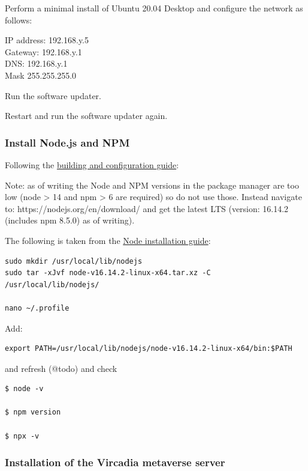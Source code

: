 Perform a minimal install of Ubuntu 20.04 Desktop and configure the
network as follows:

IP address: 192.168.y.5\\
Gateway: 192.168.y.1\\
DNS: 192.168.y.1\\
Mask 255.255.255.0

Run the software updater.

Restart and run the software updater again.

\hypertarget{install-node.js-and-npm}{%
\subsubsection{Install Node.js and NPM}\label{install-node.js-and-npm}}

Following the
\href{https://github.com/vircadia/vircadia-metaverse/blob/master/docs/Building.md}{building
and configuration guide}:

Note: as of writing the Node and NPM versions in the package manager are
too low (node \textgreater{} 14 and npm \textgreater{} 6 are required)
so do not use those. Instead navigate to:
https://nodejs.org/en/download/ and get the latest LTS (version: 16.14.2
(includes npm 8.5.0) as of writing).

The following is taken from the
\href{https://github.com/nodejs/help/wiki/Installation}{Node
installation guide}:

\begin{verbatim}
sudo mkdir /usr/local/lib/nodejs
sudo tar -xJvf node-v16.14.2-linux-x64.tar.xz -C /usr/local/lib/nodejs/

nano ~/.profile
\end{verbatim}

Add:

\begin{verbatim}
export PATH=/usr/local/lib/nodejs/node-v16.14.2-linux-x64/bin:$PATH
\end{verbatim}

and refresh (@todo) and check

\begin{verbatim}
$ node -v

$ npm version

$ npx -v
\end{verbatim}

\hypertarget{installation-of-the-vircadia-metaverse-server}{%
\subsubsection{Installation of the Vircadia metaverse
server}\label{installation-of-the-vircadia-metaverse-server}}

